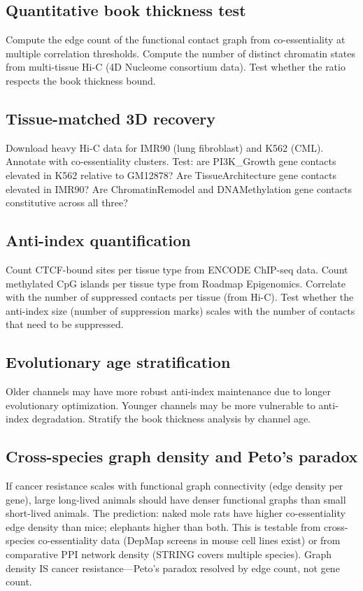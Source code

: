 \documentclass[11pt]{article}
\theoremstyle{definition}
\begin{document}
\subsection{Quantitative book thickness test}

Compute the edge count of the functional contact graph from co-essentiality at multiple correlation thresholds. Compute the number of distinct chromatin states from multi-tissue Hi-C (4D Nucleome consortium data). Test whether the ratio respects the book thickness bound.

\subsection{Tissue-matched 3D recovery}

Download heavy Hi-C data for IMR90 (lung fibroblast) and K562 (CML). Annotate with co-essentiality clusters. Test: are PI3K\_Growth gene contacts elevated in K562 relative to GM12878? Are TissueArchitecture gene contacts elevated in IMR90? Are ChromatinRemodel and DNAMethylation gene contacts constitutive across all three?

\subsection{Anti-index quantification}

Count CTCF-bound sites per tissue type from ENCODE ChIP-seq data. Count methylated CpG islands per tissue type from Roadmap Epigenomics. Correlate with the number of suppressed contacts per tissue (from Hi-C). Test whether the anti-index size (number of suppression marks) scales with the number of contacts that need to be suppressed.

\subsection{Evolutionary age stratification}

Older channels may have more robust anti-index maintenance due to longer evolutionary optimization. Younger channels may be more vulnerable to anti-index degradation. Stratify the book thickness analysis by channel age.

\subsection{Cross-species graph density and Peto's paradox}

If cancer resistance scales with functional graph connectivity (edge density per gene), large long-lived animals should have denser functional graphs than small short-lived animals. The prediction: naked mole rats have higher co-essentiality edge density than mice; elephants higher than both. This is testable from cross-species co-essentiality data (DepMap screens in mouse cell lines exist) or from comparative PPI network density (STRING covers multiple species). Graph density IS cancer resistance---Peto's paradox resolved by edge count, not gene count.
\end{document}
